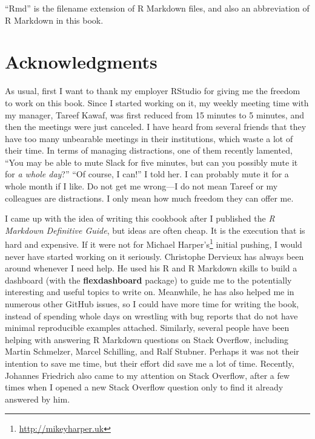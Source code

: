 \documentclass[
  11pt,
]{krantz}
\renewcommand{\href}[2]{#2\footnote{\url{#1}}}
\begin{document}
``Rmd'' is the filename extension of R Markdown files, and also an abbreviation of R Markdown in this book.

\hypertarget{acknowledgments}{%
\section*{Acknowledgments}\label{acknowledgments}}


As usual, first I want to thank my employer RStudio for giving me the freedom to work on this book. Since I started working on it, my weekly meeting time with my manager, Tareef Kawaf, was first reduced from 15 minutes to 5 minutes, and then the meetings were just canceled. I have heard from several friends that they have too many unbearable meetings in their institutions, which waste a lot of their time. In terms of managing distractions, one of them recently lamented, ``You may be able to mute Slack for five minutes, but can you possibly mute it for \emph{a whole day}?'' ``Of course, I can!'' I told her. I can probably mute it for a whole month if I like. Do not get me wrong---I do not mean Tareef or my colleagues are distractions. I only mean how much freedom they can offer me.

I came up with the idea of writing this cookbook after I published the \emph{R Markdown Definitive Guide}, but ideas are often cheap. It is the execution that is hard and expensive. If it were not for \href{http://mikeyharper.uk}{Michael Harper's} initial pushing, I would never have started working on it seriously. Christophe Dervieux has always been around whenever I need help. He used his R and R Markdown skills to build a dashboard (with the \textbf{flexdashboard} package) to guide me to the potentially interesting and useful topics to write on. Meanwhile, he has also helped me in numerous other GitHub issues, so I could have more time for writing the book, instead of spending whole days on wrestling with bug reports that do not have minimal reproducible examples attached. Similarly, several people have been helping with answering R Markdown questions on Stack Overflow, including Martin Schmelzer, Marcel Schilling, and Ralf Stubner. Perhaps it was not their intention to save me time, but their effort did save me a lot of time. Recently, Johannes Friedrich also came to my attention on Stack Overflow, after a few times when I opened a new Stack Overflow question only to find it already answered by him.
\end{document}
